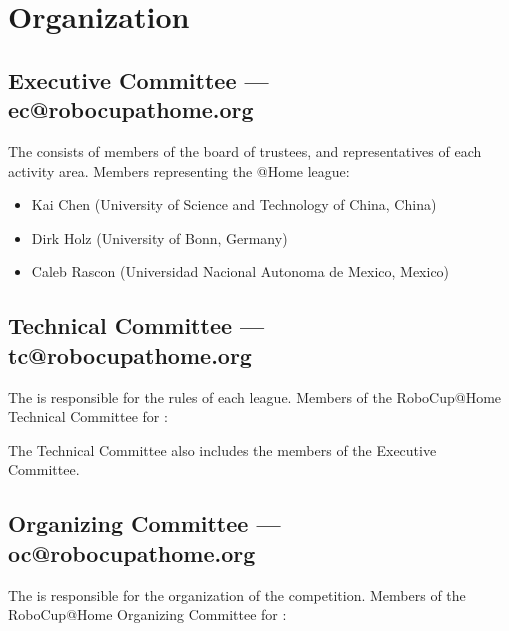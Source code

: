 \section{Organization}

\subsection{Executive Committee --- ec@robocupathome.org}
\label{sec:ec}
The  consists of members of the board of trustees, and representatives of each activity area. Members representing the @Home league:
\begin{itemize}
  \item Kai Chen (University of Science and Technology of China, China)
  \item Dirk Holz (University of Bonn, Germany)
  \item Caleb Rascon (Universidad Nacional Autonoma de Mexico, Mexico)
\end{itemize}

\subsection{Technical Committee --- tc@robocupathome.org}
\label{sec:tc}
The  is responsible for the rules of each league. Members of the RoboCup@Home Technical Committee for \YEAR:
\begin{itemize}
\end{itemize}
The Technical Committee also includes the members of the Executive Committee.

\subsection{Organizing Committee --- oc@robocupathome.org}
\label{sec:oc}
The  is responsible for the organization of the competition. Members of the RoboCup@Home Organizing Committee for \YEAR:

